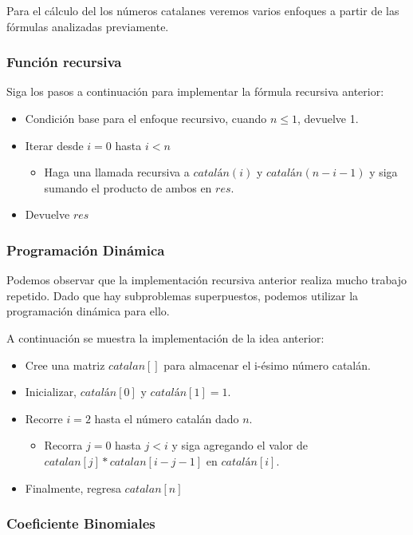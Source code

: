 Para el cálculo del los números catalanes veremos varios enfoques a partir de las fórmulas analizadas previamente.

\subsubsection{Función recursiva}
Siga los pasos a continuación para implementar la fórmula recursiva anterior:

\begin{itemize}
	\item Condición base para el enfoque recursivo, cuando $n \le 1$, devuelve 1.
	\item Iterar desde $i = 0$ hasta $i < n$
	\begin{itemize}
		\item Haga una llamada recursiva a $catalán(i)$ y $catalán(n-i-1)$ y siga sumando el producto de ambos en $res$.
	\end{itemize}
	\item Devuelve $res$
\end{itemize}

\subsubsection{Programación Dinámica}

Podemos observar que la implementación recursiva anterior realiza mucho trabajo repetido. Dado que hay subproblemas superpuestos, podemos utilizar la programación dinámica para ello.

A continuación se muestra la implementación de la idea anterior:

\begin{itemize}
	\item Cree una matriz $catalan[]$ para almacenar el i-ésimo número catalán.
	\item Inicializar, $catalán[0]$ y $catalán[1] = 1$.
	\item Recorre $i = 2$ hasta el número catalán dado $n$.
	\begin{itemize}
		\item Recorra $j = 0$ hasta $j < i$ y siga agregando el valor de $catalan[j] * catalan[i-j-1]$ en $catalán[i]$.
	\end{itemize}
	\item Finalmente, regresa $catalan[n]$
\end{itemize}

\subsubsection{Coeficiente Binomiales}


